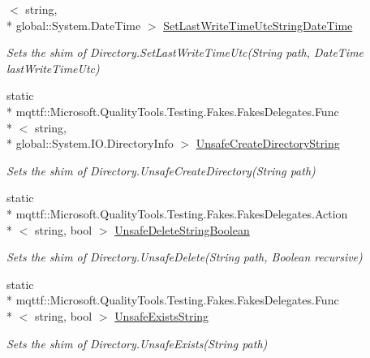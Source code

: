 \begin{DoxyCompactItemize}
$<$ string, \\*
global\-::\-System.\-Date\-Time $>$ \hyperlink{class_system_1_1_i_o_1_1_fakes_1_1_shim_directory_a208b21e3f46a2f2d7f1c4877b835f039}{Set\-Last\-Write\-Time\-Utc\-String\-Date\-Time}
\begin{DoxyCompactList}\small\item\em Sets the shim of Directory.\-Set\-Last\-Write\-Time\-Utc(\-String path, Date\-Time last\-Write\-Time\-Utc)\end{DoxyCompactList}\item 
static \\*
mqttf\-::\-Microsoft.\-Quality\-Tools.\-Testing.\-Fakes.\-Fakes\-Delegates.\-Func\\*
$<$ string, \\*
global\-::\-System.\-I\-O.\-Directory\-Info $>$ \hyperlink{class_system_1_1_i_o_1_1_fakes_1_1_shim_directory_ab965aad399d229f3aa5dbf36fd39234a}{Unsafe\-Create\-Directory\-String}
\begin{DoxyCompactList}\small\item\em Sets the shim of Directory.\-Unsafe\-Create\-Directory(\-String path)\end{DoxyCompactList}\item 
static \\*
mqttf\-::\-Microsoft.\-Quality\-Tools.\-Testing.\-Fakes.\-Fakes\-Delegates.\-Action\\*
$<$ string, bool $>$ \hyperlink{class_system_1_1_i_o_1_1_fakes_1_1_shim_directory_af9fc8f76d30819ce028d66f33804cb3b}{Unsafe\-Delete\-String\-Boolean}
\begin{DoxyCompactList}\small\item\em Sets the shim of Directory.\-Unsafe\-Delete(\-String path, Boolean recursive)\end{DoxyCompactList}\item 
static \\*
mqttf\-::\-Microsoft.\-Quality\-Tools.\-Testing.\-Fakes.\-Fakes\-Delegates.\-Func\\*
$<$ string, bool $>$ \hyperlink{class_system_1_1_i_o_1_1_fakes_1_1_shim_directory_ad631d0953e32ff3264fee4a1fcec170f}{Unsafe\-Exists\-String}
\begin{DoxyCompactList}\small\item\em Sets the shim of Directory.\-Unsafe\-Exists(\-String path)\end{DoxyCompactList}\item 

\end{DoxyCompactItemize}
